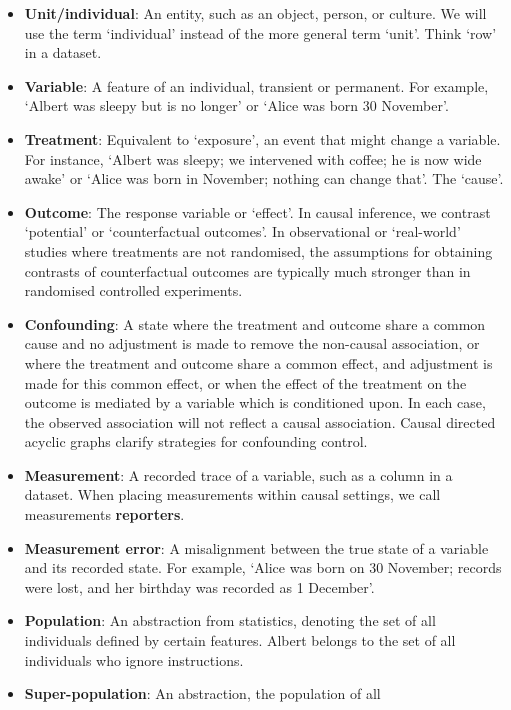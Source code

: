 \documentclass[
  single column]{article}
\begin{document}
\begin{itemize}
\item
  \textbf{Unit/individual}: An entity, such as an object, person, or
  culture. We will use the term `individual' instead of the more general
  term `unit'. Think `row' in a dataset.
\item
  \textbf{Variable}: A feature of an individual, transient or permanent.
  For example, `Albert was sleepy but is no longer' or `Alice was born
  30 November'.
\item
  \textbf{Treatment}: Equivalent to `exposure', an event that might
  change a variable. For instance, `Albert was sleepy; we intervened
  with coffee; he is now wide awake' or `Alice was born in November;
  nothing can change that'. The `cause'.
\item
  \textbf{Outcome}: The response variable or `effect'. In causal
  inference, we contrast `potential' or `counterfactual outcomes'. In
  observational or `real-world' studies where treatments are not
  randomised, the assumptions for obtaining contrasts of counterfactual
  outcomes are typically much stronger than in randomised controlled
  experiments.
\item
  \textbf{Confounding}: A state where the treatment and outcome share a
  common cause and no adjustment is made to remove the non-causal
  association, or where the treatment and outcome share a common effect,
  and adjustment is made for this common effect, or when the effect of
  the treatment on the outcome is mediated by a variable which is
  conditioned upon. In each case, the observed association will not
  reflect a causal association. Causal directed acyclic graphs clarify
  strategies for confounding control.
\item
  \textbf{Measurement}: A recorded trace of a variable, such as a column
  in a dataset. When placing measurements within causal settings, we
  call measurements \textbf{reporters}.
\item
  \textbf{Measurement error}: A misalignment between the true state of a
  variable and its recorded state. For example, `Alice was born on 30
  November; records were lost, and her birthday was recorded as 1
  December'.
\item
  \textbf{Population}: An abstraction from statistics, denoting the set
  of all individuals defined by certain features. Albert belongs to the
  set of all individuals who ignore instructions.
\item
  \textbf{Super-population}: An abstraction, the population of all

\end{itemize}
\end{document}
